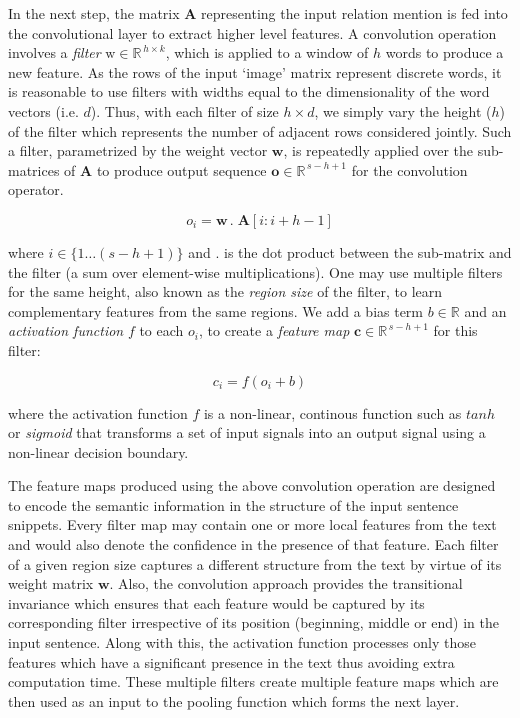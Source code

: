 In the next step, the matrix $\mathbf{A}$ representing the input relation mention is fed into the convolutional layer to extract higher level features. A convolution operation involves a {\it filter} $\mathrm{w} \in \mathbb{R}^{\,h \times k}$, which is applied to a window of $h$ words to produce a new feature. As the rows of the input `image' matrix represent discrete words, it is reasonable to use filters with widths equal to the dimensionality of the word vectors (i.e. $d$). Thus, with each filter of size $h \times d$, we simply vary the height ($h$) of the filter which represents the number of adjacent rows considered jointly. Such a filter, parametrized by the weight vector $\mathbf{w}$, is repeatedly applied over the sub-matrices of $\mathbf{A}$ to produce output sequence $\mathbf{o} \in \mathbb{R}^{\,s-h+1}$ for the convolution operator.

\begin{equation*}
    o_{i} = \mathbf{w}\,.\;\mathbf{A}[i:i+h-1]
\end{equation*}
\vspace{0.02in}

where $i \in \{1\dots (s-h+1)\}$ and $.$ is the dot product between the sub-matrix and the filter (a sum over element-wise multiplications). One may use multiple filters for the same height, also known as the {\it region size} of the filter, to learn complementary features from the same regions. We add a bias term $b \in \mathbb{R}$ and an \emph{activation function} $f$ to each $o_{i}$, to create a \emph{feature map} $\mathbf{c} \in \mathbb{R}^{\,s-h+1}$ for this filter:

\begin{equation*}
    c_{i} = f(o_{i} + b)
\end{equation*}
\vspace{0.02in}

where the activation function $f$ is a non-linear, continous function such as $tanh$ or {\it sigmoid} that transforms a set of input signals into an output signal using a non-linear decision boundary.  

The feature maps produced using the above convolution operation are designed to encode the semantic information in the structure of the input sentence snippets. Every filter map may contain one or more local features from the text and would also denote the confidence in the presence of that feature. Each filter of a given region size captures a different structure from the text by virtue of its weight matrix $\mathbf{w}$. Also, the convolution approach provides the transitional invariance which ensures that each feature would be captured by its corresponding filter irrespective of its position (beginning, middle or end) in the input sentence. Along with this, the activation function processes only those features which have a significant presence in the text thus avoiding extra computation time. These multiple filters create multiple feature maps which are then used as an input to the pooling function which forms the next layer.

